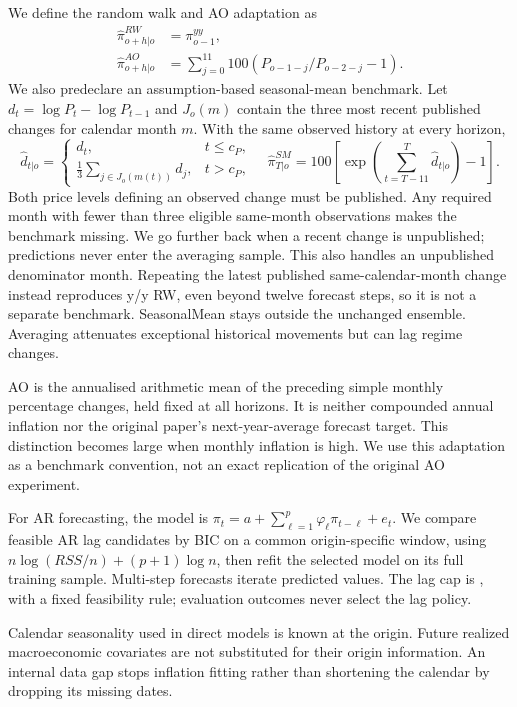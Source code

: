 We define the random walk and AO adaptation as
\begin{align}
 \widehat\pi_{o+h|o}^{RW}&=\pi_{o-1}^{yy},\\
 \widehat\pi_{o+h|o}^{AO}&=\sum_{j=0}^{11}100(P_{o-1-j}/P_{o-2-j}-1).
\end{align}
We also predeclare an assumption-based seasonal-mean benchmark. Let $d_t=\log P_t-\log P_{t-1}$ and $J_o(m)$ contain the three most recent published changes for calendar month $m$. With the same observed history at every horizon,
\begin{equation}
 \widehat d_{t|o}=\begin{cases}d_t,&t\leq c_P,\\ \frac13\sum_{j\in J_o(m(t))}d_j,&t>c_P,\end{cases}
 \quad \widehat\pi^{SM}_{T|o}=100\left[\exp\left(\sum_{t=T-11}^{T}\widehat d_{t|o}\right)-1\right].
\end{equation}
Both price levels defining an observed change must be published. Any required month with fewer than three eligible same-month observations makes the benchmark missing. We go further back when a recent change is unpublished; predictions never enter the averaging sample. This also handles an unpublished denominator month. Repeating the latest published same-calendar-month change instead reproduces y/y RW, even beyond twelve forecast steps, so it is not a separate benchmark. SeasonalMean stays outside the unchanged ensemble. Averaging attenuates exceptional historical movements but can lag regime changes.

AO is the annualised arithmetic mean of the preceding simple monthly percentage changes, held fixed at all horizons. It is neither compounded annual inflation nor the original paper's next-year-average forecast target. This distinction becomes large when monthly inflation is high. We use this adaptation as a benchmark convention, not an exact replication of the original AO experiment.

For AR forecasting, the model is $\pi_t=a+\sum_{\ell=1}^{p}\varphi_\ell\pi_{t-\ell}+e_t$. We compare feasible AR lag candidates by BIC on a common origin-specific window, using $n\log(RSS/n)+(p+1)\log n$, then refit the selected model on its full training sample. Multi-step forecasts iterate predicted values. The lag cap is \ARCap{}, with a fixed feasibility rule; evaluation outcomes never select the lag policy.

Calendar seasonality used in direct models is known at the origin. Future realized macroeconomic covariates are not substituted for their origin information. An internal data gap stops inflation fitting rather than shortening the calendar by dropping its missing dates.
